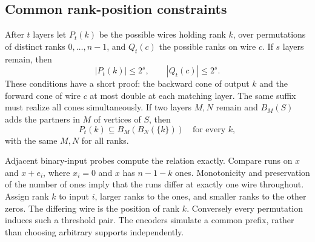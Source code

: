 \documentclass[11pt]{article}
\begin{document}
\subsection{Common rank-position constraints}
After $t$ layers let $P_t(k)$ be the possible wires holding rank $k$, over permutations of distinct ranks $0,\ldots,n-1$, and $Q_t(c)$ the possible ranks on wire $c$. If $s$ layers remain, then
\begin{equation}\label{eq:cones}
|P_t(k)|\le2^s,\qquad |Q_t(c)|\le2^s.
\end{equation}
These conditions have a short proof: the backward cone of output $k$ and the forward cone of wire $c$ at most double at each matching layer. The same suffix must realize all cones simultaneously. If two layers $M,N$ remain and $B_M(S)$ adds the partners in $M$ of vertices of $S$, then
\[
P_t(k)\subseteq B_M(B_N(\{k\}))\quad\text{for every }k,
\]
with the same $M,N$ for all ranks.

Adjacent binary-input probes compute the relation exactly. Compare runs on $x$ and $x+e_i$, where $x_i=0$ and $x$ has $n-1-k$ ones. Monotonicity and preservation of the number of ones imply that the runs differ at exactly one wire throughout. Assign rank $k$ to input $i$, larger ranks to the ones, and smaller ranks to the other zeros. The differing wire is the position of rank $k$. Conversely every permutation induces such a threshold pair. The encoders simulate a common prefix, rather than choosing arbitrary supports independently.
\end{document}
